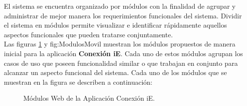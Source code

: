 
	El sistema se encuentra organizado por módulos con la finalidad de agrupar y administrar de mejor manera los requerimientos funcionales del sistema. Dividir el sistema en módulos permite visualizar e identificar rápidamente aquellos aspectos funcionales que pueden tratarse conjuntamente. \\

    Las figuras \ref{fig:ModulosWeb} y {fig:ModulosMovil} muestran los módulos propuestos de manera inicial para la aplicación \textbf{Conexión iE}. Cada uno de estos módulos agrupan los casos de uso que poseen funcionalidad similar o que trabajan en conjunto para alcanzar un aspecto funcional del sistema. Cada uno de los módulos que se muestran en la figura se describen a continuación:


    \begin{figure}[h!]
	\begin{center}
	\caption{Módulos Web de la Aplicación Conexión iE.}
	\label{fig:ModulosWeb}
	\end{center}
    \end{figure}

